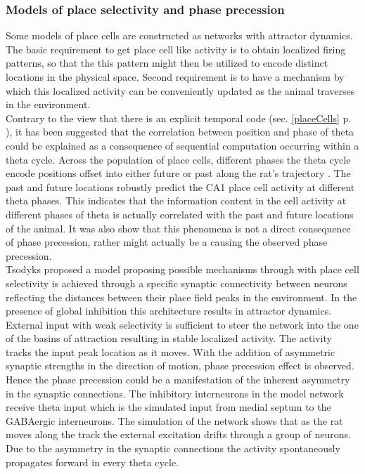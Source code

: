 \subsubsection{Models of place selectivity and phase precession}
Some models of place cells are constructed as networks with attractor dynamics. The basic requirement to get place cell like activity is to obtain localized firing patterns, so that the this pattern might then be utilized to encode distinct locations in the physical space. Second requirement is to have a mechanism by which this localized activity can be conveniently updated as the animal traverses in the environment.  \\

Contrary to the view that there is an explicit temporal code (sec. \ref{placeCells} p. \pageref{placeCells}), it has been suggested that the correlation between position and phase of theta could be explained as a consequence of sequential computation occurring within a theta cycle. Across the population of place cells, different phases the theta cycle encode positions offset into either future or past along the rat's trajectory \cite{Itskov2008}. The past and future locations robustly predict the CA1 place cell activity at different theta phases. This indicates that the information content in the cell activity at different phases of theta is actually correlated with the past and future locations of the animal. It was also show that this phenomena is not a direct consequence of phase precession, rather might actually be a causing the observed phase precession. \\

Tsodyks \cite{Tsodyks1996} proposed a model proposing possible mechanisms through with place cell selectivity is achieved through a specific synaptic connectivity between neurons reflecting the distances between their place field peaks in the environment. In the presence of global inhibition this architecture results in attractor dynamics. External input with weak selectivity is sufficient to steer the network into the one of the basins of attraction resulting in stable localized activity. The activity tracks the input peak location as it moves. With the addition of asymmetric synaptic strengths in the direction of motion, phase precession effect is observed. Hence the phase precession could be a manifestation of the inherent asymmetry in the synaptic connections. The inhibitory interneurons in the model network receive theta input which is the simulated input from medial septum to the GABAergic interneurons. The simulation of the network shows that as the rat moves along the track the external excitation drifts through a group of neurons. Due to the asymmetry in the synaptic connections the activity spontaneously propagates forward in every theta cycle. \\  

